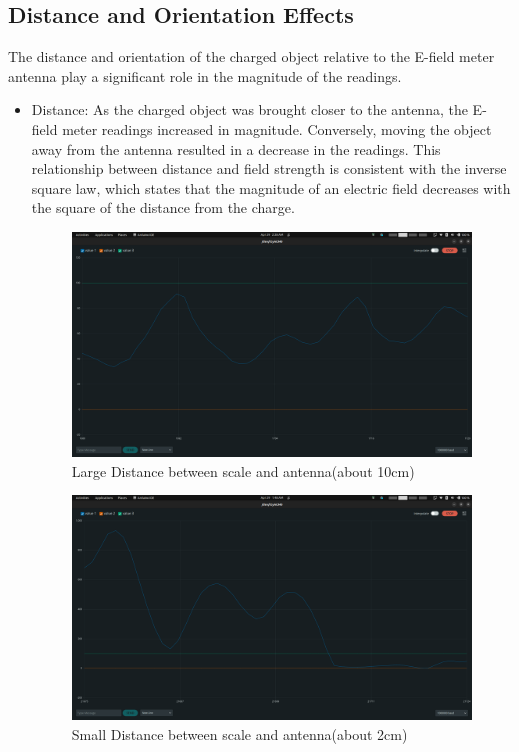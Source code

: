 \documentclass[a4paper,11pt]{article}%
\begin{document}
\subsection{Distance and Orientation Effects}
The distance and orientation of the charged object relative to the E-field meter antenna play a significant role in the magnitude of the readings.
\begin{itemize}
  \item Distance: As the charged object was brought closer to the antenna, the E-field meter readings increased in magnitude. Conversely, moving the object away from the antenna resulted in a decrease in the readings. This relationship between distance and field strength is consistent with the inverse square law, which states that the magnitude of an electric field decreases with the square of the distance from the charge.


        \begin{figure}[H]
          \centering
          \includegraphics[scale=0.2]{figures/large_distance.png}
          \caption{Large Distance between scale and antenna(about 10cm)}
        \end{figure}

        \begin{figure}[H]
          \centering
          \includegraphics[scale=0.2]{figures/scale.png}
          \caption{Small Distance between scale and antenna(about 2cm)}
        \end{figure}


\end{itemize}
\end{document}
